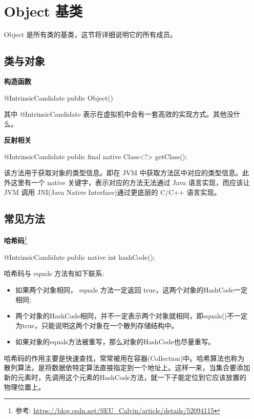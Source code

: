 \section{Object 基类}

Object 是所有类的基类，这节将详细说明它的所有成员。

\subsection{类与对象}

\noindent\textbf{构造函数}
\begin{Java}
@IntrinsicCandidate
public Object() {}
\end{Java}

其中 @IntrinsicCandidate 表示在虚拟机中会有一套高效的实现方式。其他没什么。

\noindent\textbf{反射相关}
\begin{Java}
@IntrinsicCandidate
public final native Class<?> getClass();
\end{Java}

该方法用于获取对象的类型信息。即在 JVM 中获取方法区中对应的类型信息。此外这里有一个 native 关键字，表示对应的方法无法通过 Java 语言实现，而应该让 JVM 调用 JNI(Java Native Interface)通过更底层的 C/C++ 语言实现。

\subsection{常见方法}

\noindent\textbf{哈希码}\footnote{参考: \url{https://blog.csdn.net/SEU_Calvin/article/details/52094115}}

\begin{Java}
@IntrinsicCandidate
public native int hashCode();
\end{Java}

哈希码与 equals 方法有如下联系:
\begin{itemize}
    \item 如果两个对象相同， equals 方法一定返回 true，这两个对象的HashCode一定相同;
    \item 两个对象的HashCode相同，并不一定表示两个对象就相同，即equals()不一定为true，只能说明这两个对象在一个散列存储结构中。
    \item 如果对象的equals方法被重写，那么对象的HashCode也尽量重写。
\end{itemize}

哈希码的作用主要是快速查找，常常被用在容器(Collection)中。哈希算法也称为散列算法，是将数据依特定算法直接指定到一个地址上。这样一来，当集合要添加新的元素时，先调用这个元素的HashCode方法，就一下子能定位到它应该放置的物理位置上。

